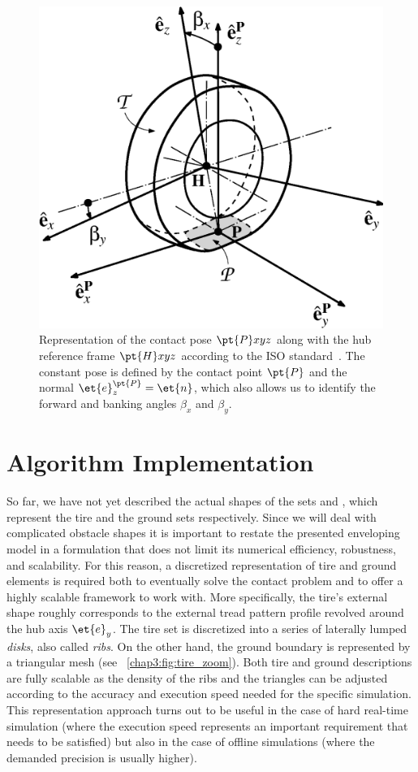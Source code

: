 \begin{figure}[htp]
  \centering
  \includegraphics[width=0.5\columnwidth]{./figures/chapter_3/tire_iso}
  \caption{Representation of the contact pose $\pt{P}xyz$ along with the hub reference frame $\pt{H}xyz$ according to the ISO standard~\cite{iso88552011}. The constant pose is defined by the contact point $\pt{P}$ and the normal $\et{e}^\pt{P}_z = \et{n}$, which also allows us to identify the forward and banking angles $\beta_x$ and $\beta_y$.}
  \label{chap3:fig:tire_iso}
\end{figure}


\section{Algorithm Implementation}
\label{chap3:Algorithm}

So far, we have not yet described the actual shapes of the sets  and , which represent the tire and the ground sets respectively. Since we will deal with complicated obstacle shapes it is important to restate the presented enveloping model in a formulation that does not limit its numerical efficiency, robustness, and scalability. For this reason, a discretized representation of tire and ground elements is required both to eventually solve the contact problem and to offer a highly scalable framework to work with. More specifically, the tire's external shape roughly corresponds to the external tread pattern profile revolved around the hub axis $\et{e}_y$. The tire set is discretized into a series of laterally lumped \emph{disks}, also called \emph{ribs}. On the other hand, the ground boundary is represented by a triangular mesh (see \figurename{}~\ref{chap3:fig:tire_zoom}). Both tire and ground descriptions are fully scalable as the density of the ribs and the triangles can be adjusted according to the accuracy and execution speed needed for the specific simulation. This representation approach turns out to be useful in the case of hard real-time simulation (where the execution speed represents an important requirement that needs to be satisfied) but also in the case of offline simulations (where the demanded precision is usually higher).

